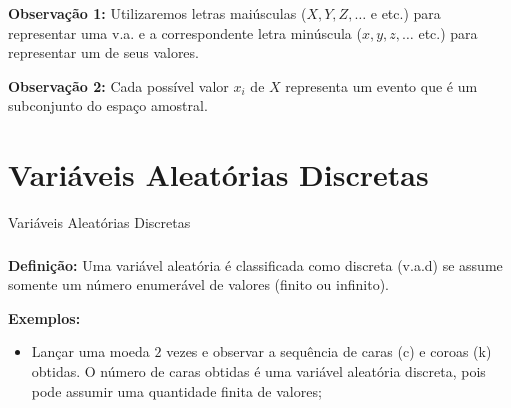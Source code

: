 \documentclass[14pt,aspectratio=1610]{beamer}
\begin{document}
\begin{frame}{}
\frametitle{}
\begin{block}{}
\justifying
\textbf{Observação 1:} Utilizaremos letras maiúsculas ($X,Y, Z,\ldots $ e etc.) para representar uma v.a. e a correspondente letra minúscula ($x,y,z,\ldots$ etc.) para 
representar um de seus valores.

\textbf{Observação 2:} Cada possível valor $x_{i}$ de $X$ representa um evento que é um subconjunto do espaço amostral.
\end{block}
\end{frame}

\begin{frame}{}
\frametitle{}
\begin{block}{}
\justifying
{}
\end{block}
\end{frame}

\section{Variáveis Aleatórias Discretas}
\begin{frame}{Variáveis Aleatórias Discretas}
\frametitle{}
\begin{block}{}
\justifying
\textbf{Definição:} Uma variável aleatória é classificada como discreta (v.a.d) se assume somente um número enumerável de valores (finito ou infinito).

\textbf{Exemplos:}

\begin{itemize}
\item Lançar uma moeda $2$ vezes e observar a sequência de caras (c) e coroas (k) obtidas. O número de caras obtidas é uma variável aleatória dis\-cre\-ta, pois pode assumir uma quantidade finita de valores;
\end{itemize}
\end{block}
\end{frame}
\end{document}
